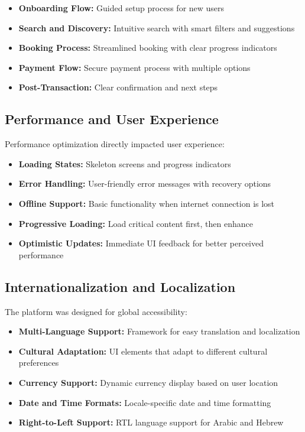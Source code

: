 \documentclass[conference]{IEEEtran}
\begin{document}
\begin{itemize}
    \item \textbf{Onboarding Flow:} Guided setup process for new users
    \item \textbf{Search and Discovery:} Intuitive search with smart filters and suggestions
    \item \textbf{Booking Process:} Streamlined booking with clear progress indicators
    \item \textbf{Payment Flow:} Secure payment process with multiple options
    \item \textbf{Post-Transaction:} Clear confirmation and next steps
\end{itemize}

\subsection{Performance and User Experience}
Performance optimization directly impacted user experience:

\begin{itemize}
    \item \textbf{Loading States:} Skeleton screens and progress indicators
    \item \textbf{Error Handling:} User-friendly error messages with recovery options
    \item \textbf{Offline Support:} Basic functionality when internet connection is lost
    \item \textbf{Progressive Loading:} Load critical content first, then enhance
    \item \textbf{Optimistic Updates:} Immediate UI feedback for better perceived performance
\end{itemize}

\subsection{Internationalization and Localization}
The platform was designed for global accessibility:

\begin{itemize}
    \item \textbf{Multi-Language Support:} Framework for easy translation and localization
    \item \textbf{Cultural Adaptation:} UI elements that adapt to different cultural preferences
    \item \textbf{Currency Support:} Dynamic currency display based on user location
    \item \textbf{Date and Time Formats:} Locale-specific date and time formatting
    \item \textbf{Right-to-Left Support:} RTL language support for Arabic and Hebrew
\end{itemize}
\end{document}
